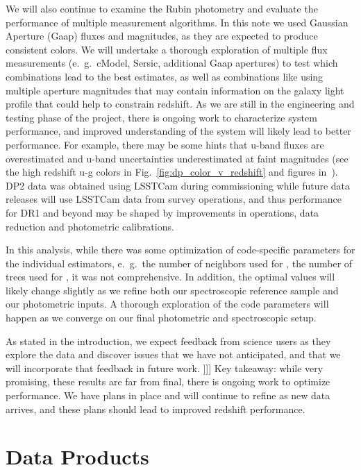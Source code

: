 We will also continue to examine the Rubin photometry and evaluate the performance of multiple measurement algorithms.  In this note we used Gaussian Aperture (Gaap) fluxes and magnitudes, as they are expected to produce consistent colors.  We will undertake a thorough exploration of multiple flux measurements (e.~g.~cModel, Sersic, additional Gaap apertures) to test which combinations lead to the best \photoz estimates, as well as combinations like using multiple aperture magnitudes that may contain information on the galaxy light profile that could help to constrain redshift.  As we are still in the engineering and testing phase of the project, there is ongoing work to characterize system performance, and improved understanding of the system will likely lead to better \photoz performance.  For example, there may be some hints that u-band fluxes are overestimated and u-band uncertainties underestimated at faint magnitudes (see the high redshift u-g colors in Fig.~\ref{fig:dp_color_v_redshift} and figures in~\citet{2026AJ....171..360V}).   DP2 data was obtained using LSSTCam during commissioning while future data releases will use LSSTCam data from survey operations, and thus performance for DR1 and beyond may be shaped by improvements in operations, data reduction and photometric calibrations.

In this analysis, while there was some optimization of code-specific parameters for the individual estimators, e.~g.~the number of neighbors used for , the number of trees used for , it was not comprehensive.  In addition, the optimal values will likely change slightly as we refine both our spectroscopic reference sample and our photometric inputs.  A thorough exploration of the code parameters will happen as we converge on our final photometric and spectroscopic setup.

As stated in the introduction, we expect feedback from science users as they explore the data and discover issues that we have not anticipated, and that we will incorporate that feedback in future work.
]]]
Key takeaway: while very promising, these results are far from final, there is ongoing work to optimize \photoz performance.  We have plans in place and will continue to refine as new data arrives, and these plans should lead to improved redshift performance.

\pagebreak

\appendix

\section{Data Products}
\label{sec:products:0}

